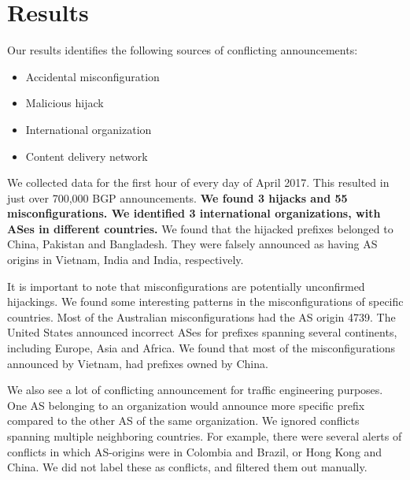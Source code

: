  \section{Results}\label{sec:results}
 
Our results identifies the following sources of conflicting announcements:
\begin{itemize}
\item Accidental misconfiguration
\item Malicious hijack
\item International organization
\item Content delivery network
\end{itemize}

We collected data for the first hour of every day of April 2017. This resulted in just over 700,000 BGP announcements. \textbf{We found 3 hijacks and 55 misconfigurations. We identified 3 international organizations, with ASes in different countries.} We found that the hijacked prefixes belonged to China, Pakistan and Bangladesh. They were falsely announced as having AS origins in Vietnam, India and India, respectively.

It is important to note that misconfigurations are potentially unconfirmed hijackings. We found some interesting patterns in the misconfigurations of specific countries. Most of the Australian misconfigurations had the AS origin 4739. The United States announced incorrect ASes for prefixes spanning several continents, including Europe, Asia and Africa. We found that most of the misconfigurations announced by Vietnam, had prefixes owned by China. 

We also see a lot of conflicting announcement for traffic engineering purposes. One AS belonging to an organization would announce more specific prefix compared to the other AS of the same organization. We ignored conflicts spanning multiple neighboring countries. For example, there were several alerts of conflicts in which AS-origins were in Colombia and Brazil, or Hong Kong and China. We did not label these as conflicts, and filtered them out manually.
